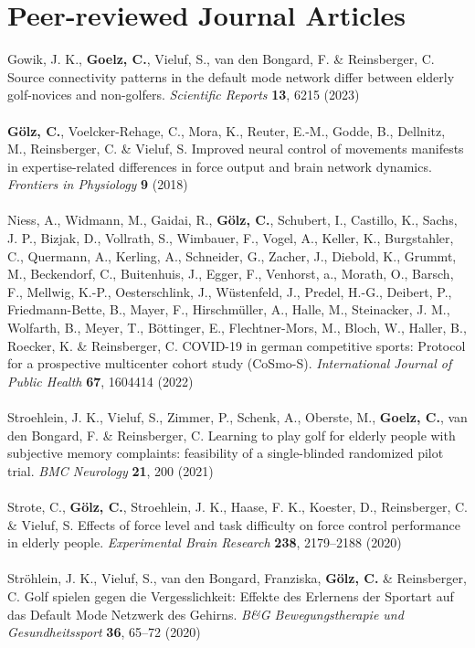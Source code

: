 \section*{Peer-reviewed Journal Articles}
Gowik, J. K., \textbf{Goelz, C.}, Vieluf, S., van den Bongard, F. \& Reinsberger, C. Source connectivity patterns in the default mode network differ between elderly golf-novices and non-golfers. \textit{Scientific Reports} \textbf{13}, 6215 (2023)\\
\\
\noindent\textbf{Gölz, C.}, Voelcker-Rehage, C., Mora, K., Reuter, E.-M., Godde, B., Dellnitz, M., Reinsberger, C. \& Vieluf, S. Improved neural control of movements manifests in expertise-related differences in force output and brain network dynamics. \textit{Frontiers in Physiology} \textbf{9} (2018)\\
\\
Niess, A., Widmann, M., Gaidai, R., \textbf{Gölz, C.}, Schubert, I., Castillo, K., Sachs, J. P., Bizjak, D., Vollrath, S., Wimbauer, F., Vogel, A., Keller, K., Burgstahler, C., Quermann, A., Kerling, A., Schneider, G., Zacher, J., Diebold, K., Grummt, M., Beckendorf, C., Buitenhuis, J., Egger, F., Venhorst, a., Morath, O., Barsch, F., Mellwig, K.-P., Oesterschlink, J., Wüstenfeld, J., Predel, H.-G., Deibert, P., Friedmann-Bette, B., Mayer, F., Hirschmüller, A., Halle, M., Steinacker, J. M., Wolfarth, B., Meyer, T., Böttinger, E., Flechtner-Mors, M., Bloch, W., Haller, B., Roecker, K. \& Reinsberger, C. COVID-19 in german competitive sports: Protocol for a prospective multicenter cohort study (CoSmo-S). \textit{International Journal of Public Health} \textbf{67}, 1604414 (2022)\\
\\
Stroehlein, J. K., Vieluf, S., Zimmer, P., Schenk, A., Oberste, M., \textbf{Goelz, C.}, van den Bongard, F. \& Reinsberger, C. Learning to play golf for elderly people with subjective memory complaints: feasibility of a single-blinded randomized pilot trial. \textit{BMC Neurology} \textbf{21}, 200 (2021)\\
\\
Strote, C., \textbf{Gölz, C.}, Stroehlein, J. K., Haase, F. K., Koester, D., Reinsberger, C. \& Vieluf, S. Effects of force level and task difficulty on force control performance in elderly people. \textit{Experimental Brain Research} \textbf{238}, 2179--2188 (2020)\\
\\
Ströhlein, J. K., Vieluf, S., van den Bongard, Franziska, \textbf{Gölz, C.} \& Reinsberger, C. Golf spielen gegen die Vergesslichkeit: Effekte des Erlernens der Sportart auf das Default Mode Netzwerk des Gehirns. \textit{B\&G Bewegungstherapie und Gesundheitssport} \textbf{36}, 65--72 (2020)

